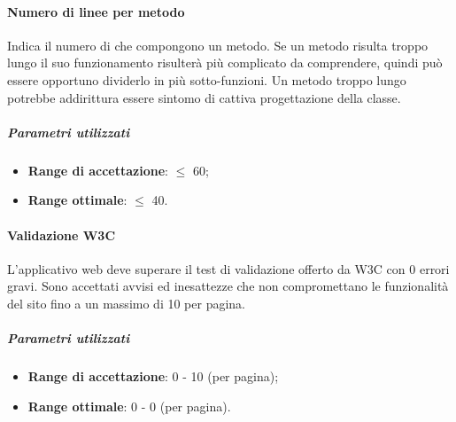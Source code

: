 \documentclass[../PianoDiQualifica.tex]{subfiles}
\begin{document}
				\paragraph{Numero di linee per metodo\\}
					Indica il numero di  che compongono un metodo.
					Se un metodo risulta troppo lungo il suo funzionamento risulterà più
					complicato da comprendere, quindi può essere opportuno dividerlo in
					più sotto-funzioni. Un metodo troppo lungo potrebbe addirittura essere
					sintomo di cattiva progettazione della classe.
					\subparagraph{Parametri utilizzati}
						\begin{itemize}
							\item \textbf{Range di accettazione}: $\leq$ 60;
							\item \textbf{Range ottimale}: $\leq$ 40.
						\end{itemize}
				\paragraph{Validazione W3C\\}
					L'applicativo web deve superare il test di validazione offerto da
					W3C con 0 errori gravi.
					Sono accettati avvisi ed inesattezze che non compromettano le
					funzionalità del sito fino a un massimo di 10 per pagina.
					\subparagraph{Parametri utilizzati}
						\begin{itemize}
							\item \textbf{Range di accettazione}: 0 - 10 (per pagina);
							\item \textbf{Range ottimale}: 0 - 0 (per pagina).
						\end{itemize}
\end{document}

